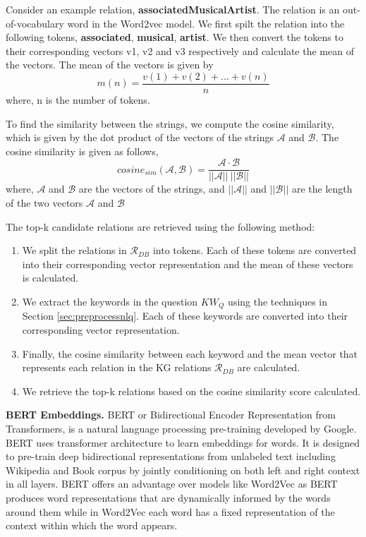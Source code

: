 Consider an example relation, \textbf{associatedMusicalArtist}. The relation is an out-of-vocabulary word in the Word2vec model. We first spilt the relation into the following tokens, \textbf{associated}, \textbf{musical}, \textbf{artist}. We then convert the tokens to their corresponding vectors v1, v2 and v3 respectively and calculate the mean of the vectors. The mean of the vectors is given by
\begin{equation}
    m(n) = \frac{ v(1) + v(2) + ... + v(n)}{n}
\end{equation}
where, n is the number of tokens.

To find the similarity between the strings, we compute the cosine similarity, which is given by the dot product of the  vectors of the strings $\mathcal{A}$ and $\mathcal{B}$. The cosine similarity is given as follows,
\begin{equation}
    cosine_{sim}(\mathcal{A},\mathcal{B}) = \frac{\mathcal{A} \cdot \mathcal{B}}{||\mathcal{A}||\ ||\mathcal{B}||}
\end{equation}
where, $\mathcal{A}$ and $\mathcal{B}$ are the vectors of the strings, and $||\mathcal{A}||$ and $||\mathcal{B}||$ are the length of the two vectors $\mathcal{A}$ and $\mathcal{B}$

The top-k candidate relations are retrieved using the following method: 
\begin{enumerate}
    \item We split the relations in $\mathcal{R}_{DB}$ into tokens. Each of these tokens are converted into their corresponding vector representation and the mean of these vectors is calculated.
    \item  We extract the keywords in the question $KW_{Q}$ using the techniques in Section \ref{sec:preprocessnlq}. Each of these keywords are converted into their corresponding vector representation.
    \item Finally, the cosine similarity between each keyword and the mean vector that represents each relation in the KG relations $\mathcal{R}_{DB}$ are calculated. 
    \item We retrieve the top-k relations based on the cosine similarity score calculated.
\end{enumerate}

\textbf{BERT Embeddings.} BERT or Bidirectional Encoder Representation from Transformers, is a natural language processing pre-training developed by Google. BERT uses transformer architecture to learn embeddings for words. It is designed to pre-train deep bidirectional representations from unlabeled text including Wikipedia and Book corpus by jointly conditioning on both left and right context in all layers. BERT offers an advantage over models like Word2Vec as BERT produces word representations that are dynamically informed by the words around them while in Word2Vec each word has a fixed representation of the context within which the word appears.

